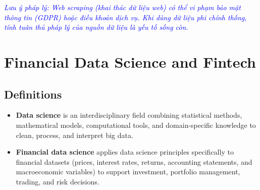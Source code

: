 \textcolor{blue}{\textit{Lưu ý pháp lý: Web scraping (khai thác dữ liệu web) có thể vi phạm bảo mật thông tin (GDPR) hoặc điều khoản dịch vụ. Khi dùng dữ liệu phi chính thống, tính tuân thủ pháp lý của nguồn dữ liệu là yếu tố sống còn.}}

\section{Financial Data Science and Fintech}
\label{sec:Financial Data Science and Fintech}

\subsection{Definitions}
\begin{itemize}[noitemsep, topsep=2pt, parsep=0pt]
	\item \textbf{Data science} is an interdisciplinary field combining statistical methods, mathematical models, computational tools, and domain-specific knowledge to clean, process, and interpret big data.
	\item \textbf{Financial data science} applies data science principles specifically to financial datasets (prices, interest rates, returns, accounting statements, and macroeconomic variables) to support investment, portfolio management, trading, and risk decisions.
\end{itemize}

